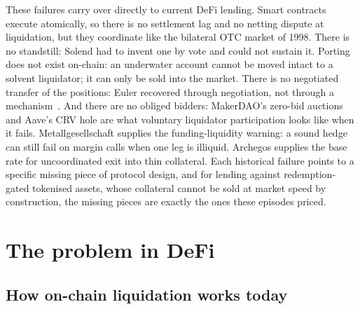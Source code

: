\documentclass[11pt,a4paper]{article}
\begin{document}
These failures carry over directly to current DeFi lending. Smart contracts execute atomically, so there is no settlement lag and no netting dispute at liquidation, but they coordinate like the bilateral OTC market of 1998. There is no standstill: Solend had to invent one by vote and could not sustain it. Porting does not exist on-chain: an underwater account cannot be moved intact to a solvent liquidator; it can only be sold into the market. There is no negotiated transfer of the positions: Euler recovered through negotiation, not through a mechanism~\cite{eulerexploit}. And there are no obliged bidders: MakerDAO's zero-bid auctions and Aave's CRV hole are what voluntary liquidator participation looks like when it fails. Metallgesellschaft supplies the funding-liquidity warning: a sound hedge can still fail on margin calls when one leg is illiquid. Archegos supplies the base rate for uncoordinated exit into thin collateral. Each historical failure points to a specific missing piece of protocol design, and for lending against redemption-gated tokenised assets, whose collateral cannot be sold at market speed by construction, the missing pieces are exactly the ones these episodes priced.

\section{The problem in DeFi}\label{sec:defi}

\subsection{How on-chain liquidation works today}
\end{document}
